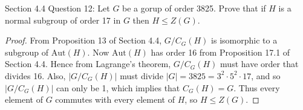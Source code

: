 Section 4.4 Question 12: Let $G$ be a gorup of order 3825. Prove that if
$H$ is a normal subgroup of order 17 in $G$ then $H\leq Z(G)$.

\begin{proof}
  From Proposition 13 of Section 4.4, $G/C_G(H)$ is isomorphic to a
  subgroup of $\text{Aut}(H)$.  Now $\text{Aut}(H)$ has order 16 from
  Proposition 17.1 of Section 4.4.  Hence from Lagrange's theorem,
  $G/C_G(H)$ must have order that divides 16. Also, $|G/C_G(H)|$ must
  divide $|G|=3825=3^2\cdot5^2\cdot17$, and so $|G/C_G(H)|$ can only be 1,
  which implies that $C_G(H)=G$. Thus every element of $G$ commutes with
  every element of $H$, so $H\leq Z(G)$.
\end{proof}
